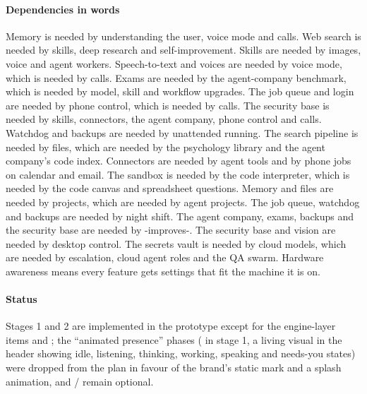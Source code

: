 \paragraph{Dependencies in words} Memory is needed by understanding the user, voice mode and calls. Web search is needed by skills, deep research and self-improvement. Skills are needed by images, voice and agent workers. Speech-to-text and voices are needed by voice mode, which is needed by calls. Exams are needed by the agent-company benchmark, which is needed by model, skill and workflow upgrades. The job queue and login are needed by phone control, which is needed by calls. The security base is needed by skills, connectors, the agent company, phone control and calls. Watchdog and backups are needed by unattended running. The search pipeline is needed by files, which are needed by the psychology library and the agent company's code index. Connectors are needed by agent tools and by phone jobs on calendar and email. The sandbox is needed by the code interpreter, which is needed by the code canvas and spreadsheet questions. Memory and files are needed by projects, which are needed by agent projects. The job queue, watchdog and backups are needed by night shift. The agent company, exams, backups and the security base are needed by \hivi{}-improves-\hivi{}. The security base and vision are needed by desktop control. The secrets vault is needed by cloud models, which are needed by escalation, cloud agent roles and the QA swarm. Hardware awareness means every feature gets settings that fit the machine it is on.

\paragraph{Status} Stages 1 and 2 are implemented in the prototype except for the engine-layer items and ; the ``animated presence'' phases ( in stage 1, a living visual in the header showing idle, listening, thinking, working, speaking and needs-you states) were dropped from the plan in favour of the brand's static mark and a splash animation, and / remain optional.
